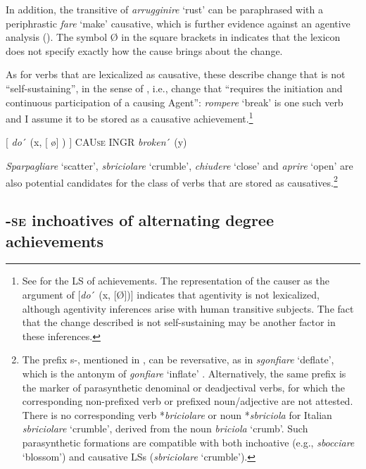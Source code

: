 \documentclass[output=paper,colorlinks,citecolor=brown
]{langscibook}
\begin{document}
In addition, the transitive of \textit{arrugginire} ‘rust’ can be paraphrased with a periphrastic \textit{fare} ‘make’ causative, which is further evidence against an agentive analysis (). The symbol Ø in the square brackets in  indicates that the lexicon does not specify exactly how the cause brings about the change.

As for verbs that are lexicalized as causative, these describe change that is not “self-sustaining”, in the sense of \citet[496]{kiparsky1997remarks}, i.e., change that “requires the initiation and continuous participation of a causing Agent”: \textit{rompere} ‘break’ is one such verb and I assume it to be stored as a causative achievement.\footnote{See \citet[114]{vanvalin2023principles} for the LS of achievements. The representation of the causer as the argument of [\textit{do}´ (x, [Ø])] indicates  that agentivity is not lexicalized, although agentivity inferences arise with human transitive subjects. The fact that the change described is not self-sustaining may be another factor in these inferences.}

\ea \label{bentley_example_47}
    $\lbrack$ \textit{do}´ (x, $\lbrack$ \o $\rbrack$ ) $\rbrack$ CAU\textsc{se} INGR \textit{broken}´ (y)
\z

\textit{Sparpagliare} ‘scatter’, \textit{sbriciolare} ‘crumble’, \textit{chiudere} ‘close’ and \textit{aprire} ‘open’ are also potential candidates for the class of verbs that are stored as causatives.\footnote{The prefix s-, mentioned in , can be reversative, as in \textit{sgonfiare} ‘deflate’, which is the antonym of \textit{gonfiare} ‘inflate’ \citep{iacobini2004prefissazione}. Alternatively, the same prefix is the marker of parasynthetic denominal or deadjectival verbs, for which the corresponding non-prefixed verb or prefixed noun/adjective are not attested. There is no corresponding verb *\textit{briciolare} or noun *\textit{sbriciola} for Italian \textit{sbriciolare} ‘crumble’, derived from the noun \textit{briciola} ‘crumb’. Such parasynthetic formations are compatible with both inchoative (e.g., \textit{sbocciare} ‘blossom’) and causative LSs (\textit{sbriciolare} ‘crumble’).}

\subsection{-\textsc{se} inchoatives of alternating degree achievements}
\label{bentley_section_5.3}
\end{document}
